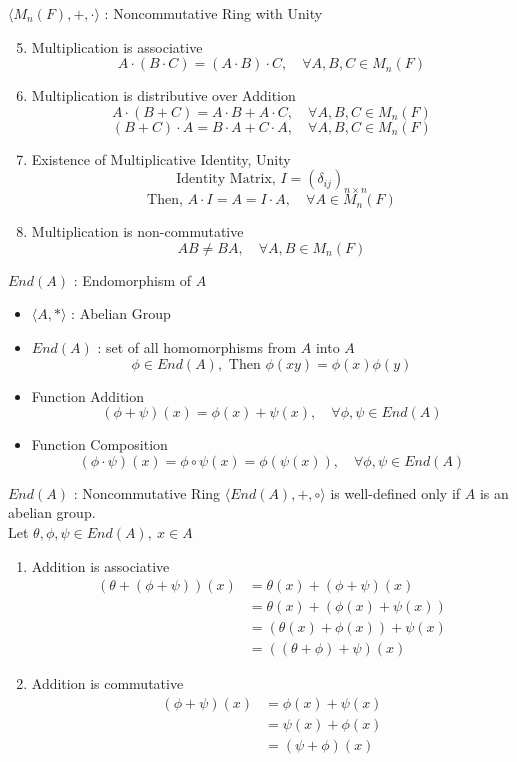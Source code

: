 \documentclass{beamer}
\begin{document}
\begin{frame}{$\langle M_n(F),+,\cdot \rangle$ : Noncommutative Ring with Unity}
\begin{enumerate}
	\setcounter{enumi}{4}
	\item Multiplication is associative
		\[ A \cdot (B \cdot C) = (A \cdot B)\cdot C, \quad \forall A,B,C \in M_n(F) \]
	\item Multiplication is distributive over Addition
		\[ A\cdot(B+C) = A\cdot B+ A \cdot C, \quad \forall A,B,C \in M_n(F) \]
		\[ (B+C)\cdot A = B\cdot A+ C \cdot A, \quad \forall A,B,C \in M_n(F) \]
	\item Existence of Multiplicative Identity, Unity
		\[ \text{Identity Matrix, }I = (\delta_{ij})_{n \times n} \]
		\[ \text{Then, } A \cdot I = A = I \cdot A, \quad \forall A \in M_n(F) \]
	\item Multiplication is non-commutative
		\[ AB \ne BA, \quad \forall A,B \in M_n(F) \]
\end{enumerate}
\end{frame}

\begin{frame}{$End(A)$ : Endomorphism of $A$}
\begin{itemize}
	\item $\langle A,\ast \rangle $ : Abelian Group
	\item $End(A)$ : set of all homomorphisms from $A$ into $A$
		\[ \phi \in End(A),\text{ Then } \phi(xy) = \phi(x)\phi(y) \]
	\item Function Addition
		\[ (\phi + \psi)(x) = \phi(x) + \psi(x), \quad \forall \phi,\psi \in End(A) \]
	\item Function Composition
		\[ (\phi \cdot \psi)(x) = \phi \circ \psi(x) = \phi(\psi(x)), \quad \forall \phi,\psi \in End(A) \]
\end{itemize}
\end{frame}

\begin{frame}{$End(A)$ : Noncommutative Ring}
	\alert{$\langle End(A),+,\circ \rangle$ is well-defined only if $A$ is an abelian group.} \\

	Let $\theta, \phi, \psi \in End(A),\ x \in A$
\begin{enumerate}
	\item Addition is associative\\
	\begin{align*}
		(\theta + (\phi + \psi))(x) & = \theta(x) + (\phi+\psi)(x) \\
		& = \theta(x) + (\phi(x) + \psi(x)) \\
		& = (\theta(x) + \phi(x))+ \psi(x) \\
		& = ((\theta + \phi) + \psi) (x)
	\end{align*}
	\item Addition is commutative
	\begin{align*}
		(\phi+\psi)(x) & = \phi(x) + \psi(x) \\
		& = \psi(x) + \phi(x) \\
		& = (\psi+\phi)(x)
	\end{align*}
\end{enumerate}
\end{frame}
\end{document}
